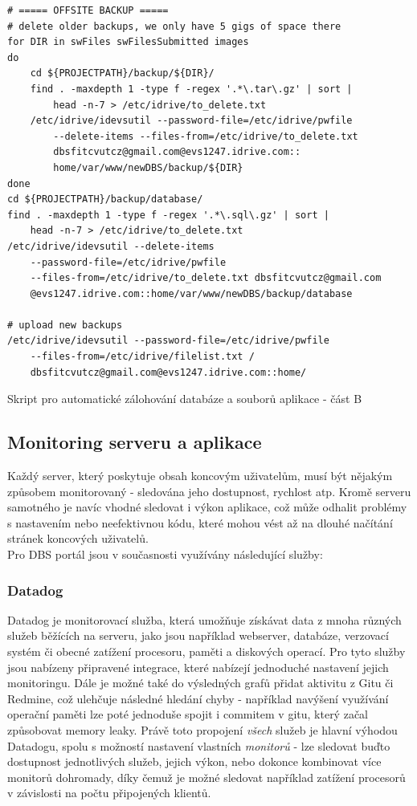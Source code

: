 \begin{listing}[H]
	\begin{verbatim}
# ===== OFFSITE BACKUP =====
# delete older backups, we only have 5 gigs of space there
for DIR in swFiles swFilesSubmitted images
do
    cd ${PROJECTPATH}/backup/${DIR}/
    find . -maxdepth 1 -type f -regex '.*\.tar\.gz' | sort |
        head -n-7 > /etc/idrive/to_delete.txt
    /etc/idrive/idevsutil --password-file=/etc/idrive/pwfile
        --delete-items --files-from=/etc/idrive/to_delete.txt
        dbsfitcvutcz@gmail.com@evs1247.idrive.com::
        home/var/www/newDBS/backup/${DIR}
done
cd ${PROJECTPATH}/backup/database/
find . -maxdepth 1 -type f -regex '.*\.sql\.gz' | sort |
    head -n-7 > /etc/idrive/to_delete.txt
/etc/idrive/idevsutil --delete-items
    --password-file=/etc/idrive/pwfile
    --files-from=/etc/idrive/to_delete.txt dbsfitcvutcz@gmail.com
    @evs1247.idrive.com::home/var/www/newDBS/backup/database

# upload new backups
/etc/idrive/idevsutil --password-file=/etc/idrive/pwfile
    --files-from=/etc/idrive/filelist.txt /
    dbsfitcvutcz@gmail.com@evs1247.idrive.com::home/
	\end{verbatim}
	\caption{Skript pro automatické zálohování databáze a souborů aplikace - část B} \label{code:backup-b}
\end{listing}

\subsection{Monitoring serveru a aplikace}

Každý server, který poskytuje obsah koncovým uživatelům, musí být nějakým způsobem monitorovaný - sledována jeho dostupnost, rychlost atp. Kromě serveru samotného je navíc vhodné sledovat i výkon aplikace, což může odhalit problémy s nastavením nebo neefektivnou kódu, které mohou vést až na dlouhé načítání stránek koncových uživatelů.\\
Pro DBS portál jsou v současnosti využívány následující služby:

\subsubsection{Datadog} \label{app:datadog}

Datadog \cite{datadog} je monitorovací služba, která umožňuje získávat data z mnoha různých služeb běžících na serveru, jako jsou například webserver, databáze, verzovací systém či obecné zatížení procesoru, paměti a diskových operací. Pro tyto služby jsou nabízeny připravené integrace, které nabízejí jednoduché nastavení jejich monitoringu. Dále je možné také do výsledných grafů přidat aktivitu z Gitu či Redmine, což ulehčuje následné hledání chyby - například navýšení využívání operační paměti lze poté jednoduše spojit i commitem v gitu, který začal způsobovat memory leaky. Právě toto propojení \emph{všech} služeb je hlavní výhodou Datadogu, spolu s možností nastavení vlastních \emph{monitorů} - lze sledovat buďto dostupnost jednotlivých služeb, jejich výkon, nebo dokonce kombinovat více monitorů dohromady, díky čemuž je možné sledovat například zatížení procesorů v závislosti na počtu připojených klientů.

